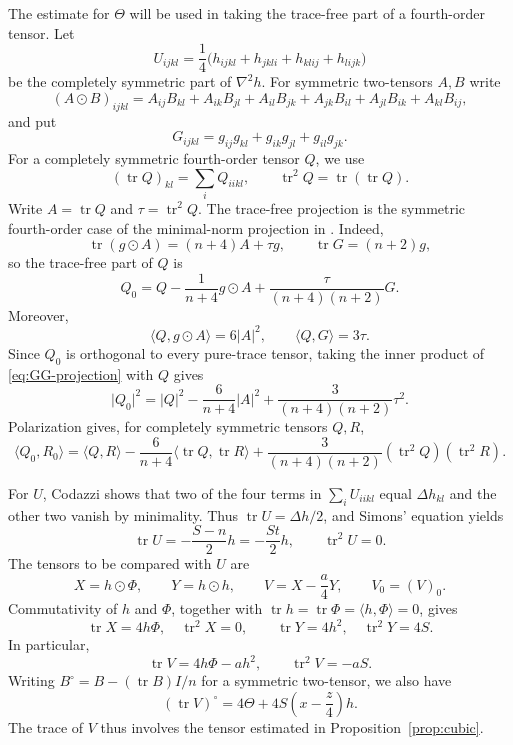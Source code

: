 \documentclass[10pt,a4paper]{amsart}
\numberwithin{equation}{section}
\newcommand{\tr}{\operatorname{tr}}
\newcommand{\ip}[2]{\langle #1,#2\rangle}
\newcommand{\norm}[1]{\lvert #1\rvert}
\begin{document}
The estimate for $\Theta$ will be used in taking the trace-free part of a fourth-order tensor. Let
\[
U_{ijkl}=\frac14\bigl(h_{ijkl}+h_{jkli}+h_{klij}+h_{lijk}\bigr)
\]
be the completely symmetric part of $\nabla^2h$. For symmetric two-tensors $A,B$ write
\[
(A\odot B)_{ijkl}
=A_{ij}B_{kl}+A_{ik}B_{jl}+A_{il}B_{jk}
+A_{jk}B_{il}+A_{jl}B_{ik}+A_{kl}B_{ij},
\]
and put
\[
G_{ijkl}=g_{ij}g_{kl}+g_{ik}g_{jl}+g_{il}g_{jk}.
\]
For a completely symmetric fourth-order tensor $Q$, we use
\[
(\tr Q)_{kl}=\sum_iQ_{iikl},
\qquad
\tr^2Q=\tr(\tr Q).
\]
Write $A=\tr Q$ and $\tau=\tr^2Q$. The trace-free projection is the symmetric fourth-order case of the minimal-norm projection in \cite[Corollary~1.4]{GuoGuan}. Indeed,
\[
\tr(g\odot A)=(n+4)A+\tau g,
\qquad
\tr G=(n+2)g,
\]
so the trace-free part of $Q$ is
\begin{equation}\label{eq:GG-projection}
Q_0
=Q-\frac1{n+4}g\odot A
+\frac{\tau}{(n+4)(n+2)}G.
\end{equation}
Moreover,
\[
\ip{Q}{g\odot A}=6\norm A^2,
\qquad
\ip{Q}{G}=3\tau.
\]
Since $Q_0$ is orthogonal to every pure-trace tensor, taking the inner
product of \eqref{eq:GG-projection} with $Q$ gives
\begin{equation}\label{eq:GG-norm}
\norm{Q_0}^2
=\norm Q^2-\frac6{n+4}\norm A^2
+\frac{3}{(n+4)(n+2)}\tau^2.
\end{equation}
Polarization gives, for completely symmetric tensors $Q,R$,
\begin{equation}\label{eq:GG-polarization}
\ip{Q_0}{R_0}
=\ip QR-\frac6{n+4}\ip{\tr Q}{\tr R}
+\frac{3}{(n+4)(n+2)}(\tr^2Q)(\tr^2R).
\end{equation}

For $U$, Codazzi shows that two of the four terms in $\sum_i U_{iikl}$ equal
$\Delta h_{kl}$ and the other two vanish by minimality. Thus
$\tr U=\Delta h/2$, and Simons' equation yields
\begin{equation}\label{eq:fourth-traces}
\tr U=-\frac{S-n}{2}h=-\frac{St}{2}h,
\qquad
\tr^2U=0.
\end{equation}
The tensors to be compared with $U$ are
\[
X=h\odot\Phi,
\qquad
Y=h\odot h,
\qquad
V=X-\frac a4Y,
\qquad
V_0=(V)_0.
\]
Commutativity of $h$ and $\Phi$, together with $\tr h=\tr\Phi=\ip h\Phi=0$, gives
\[
\tr X=4h\Phi,
\quad \tr^2X=0,
\qquad
\tr Y=4h^2,
\quad \tr^2Y=4S.
\]
In particular,
\begin{equation}\label{eq:V-traces}
\tr V=4h\Phi-ah^2,
\qquad
\tr^2V=-aS.
\end{equation}
Writing $B^\circ=B-(\tr B)I/n$ for a symmetric two-tensor, we also have
\[
(\tr V)^\circ=4\Theta+4S\left(x-\frac z4\right)h.
\]
The trace of $V$ thus involves the tensor estimated in Proposition~\ref{prop:cubic}.
\end{document}
